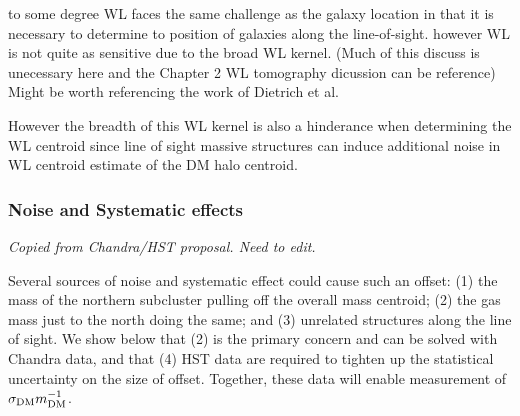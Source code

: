 to some degree WL faces the same challenge as the galaxy location in that it is necessary to determine to position of galaxies along the line-of-sight.
however WL is not quite as sensitive due to the broad WL kernel.
(Much of this discuss is unecessary here and the Chapter 2 WL tomography dicussion can be reference)
Might be worth referencing the work of Dietrich et al.

However the breadth of this WL kernel is also a hinderance when determining the WL centroid since line of sight massive structures can induce additional noise in WL centroid estimate of the DM halo centroid.

\subsubsection{Noise and Systematic effects}

\textit{Copied from Chandra/HST proposal. Need to edit.}

Several sources of noise and systematic effect could cause such an offset:
(1) the mass of the northern subcluster pulling off the overall mass
centroid; (2) the gas mass just to the north doing the same; and (3)
unrelated structures along the line of sight. We show below that (2)
is the primary concern and can be solved with Chandra data, and that
(4) HST data are required to tighten up the statistical uncertainty on
the size of offset.  Together, these data will enable measurement of
$\sigma_{\rm DM}m_{\rm DM}^{-1}$.

